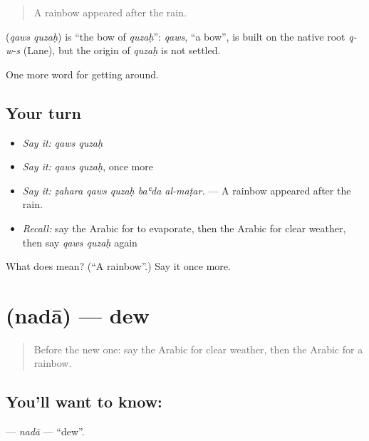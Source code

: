 \begin{quote}
A rainbow appeared after the rain.
\end{quote}

\begin{cousinweb}
\textbf{ } (\emph{qaws quzaḥ}) is \textquotedblleft{}the bow of \emph{quzaḥ}\textquotedblright{}: \emph{qaws}, \textquotedblleft{}a bow\textquotedblright{}, is built on the native root \emph{q-w-s} (Lane), but the origin of \emph{quzaḥ} is not settled.
\end{cousinweb}

\begin{grammarlens}[title={What you've built}]
One more word for getting around.
\end{grammarlens}

\subsection*{Your turn}
\begin{itemize}
\raggedright
  \item \emph{Say it:} \emph{qaws quzaḥ}
  \item \emph{Say it:} \emph{qaws quzaḥ}, once more
  \item \emph{Say it:} \emph{ẓahara qaws quzaḥ baʿda al-maṭar.} — A rainbow appeared after the rain.
  \item \emph{Recall:} say the Arabic for to evaporate, then the Arabic for clear weather, then say \emph{qaws quzaḥ} again
\end{itemize}

\begin{tcolorbox}[breakable,colback=teal!4,colframe=teal!35!black,title={Before you move on}]
What does   mean? (\textquotedblleft{}A rainbow\textquotedblright{}.) Say it once more.
\end{tcolorbox}
\section[\texorpdfstring{\ar{ندى} (nadā)}{ندى (nadā)}]{ (nadā) — dew}

\label{lesson:AR-C485-nada}



\begin{quote}
Before the new one: say the Arabic for clear weather, then the Arabic for a rainbow.
\end{quote}

\subsection*{You'll want to know: }
\textbf{} — \emph{nadā} — \textquotedblleft{}dew\textquotedblright{}.

